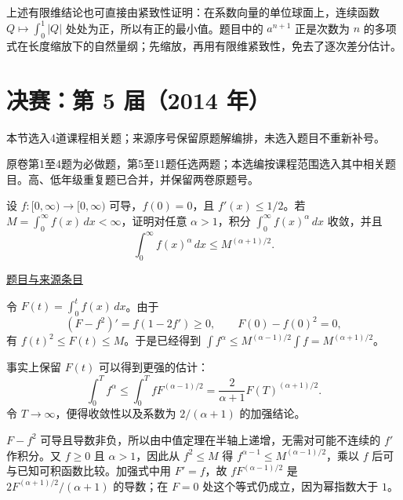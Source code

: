 \documentclass[12pt,fontset=fandol]{ctexart}
\begin{document}
\begin{remark}[方法与条件]上述有限维结论也可直接由紧致性证明：在系数向量的单位球面上，连续函数 $Q\mapsto\int_0^1|Q|$ 处处为正，所以有正的最小值。题目中的 $a^{n+1}$ 正是次数为 $n$ 的多项式在长度缩放下的自然量纲；先缩放，再用有限维紧致性，免去了逐次差分估计。\end{remark}

\section{决赛：第 5 届（2014 年）}

本节选入4道课程相关题；来源序号保留原题解编排，未选入题目不重新补号。

\begin{remark}[来源说明]原卷第1至4题为必做题，第5至11题任选两题；本选编按课程范围选入其中相关题目。高、低年级重复题已合并，并保留两卷原题号。\end{remark}

\begin{example}[来源序号3]\label{ex:fin05-hi:3}\label{pr:fin05-hi:3}

设 $f:[0,\infty)\to[0,\infty)$ 可导，$f(0)=0$，且 $f'(x)\le1/2$。若 $M=\int_0^\infty f(x)\,dx<\infty$，证明对任意 $\alpha>1$，积分 $\int_0^\infty f(x)^\alpha\,dx$ 收敛，并且
\[
\int_0^\infty f(x)^\alpha\,dx\le M^{(\alpha+1)/2}.
\]

\par\href{https://github.com/lzxcr/cmc-mathematics/blob/64916fa1fdbc3e444a652eca204d5669058ee321/src/problems/finals/05/03.md}{题目与来源条目}

\end{example}

\begin{solve}\label{ans:fin05-hi:3}

令 $F(t)=\int_0^t f(x)\,dx$。由于
\[
(F-f^2)'=f(1-2f')\ge0,\qquad F(0)-f(0)^2=0,
\]
有 $f(t)^2\le F(t)\le M$。于是已经得到
$\int f^\alpha\le M^{(\alpha-1)/2}\int f=M^{(\alpha+1)/2}$。

事实上保留 $F(t)$ 可以得到更强的估计：
\[
\int_0^T f^\alpha
\le\int_0^T fF^{(\alpha-1)/2}
=\frac{2}{\alpha+1}F(T)^{(\alpha+1)/2}.
\]
令 $T\to\infty$，便得收敛性以及系数为 $2/(\alpha+1)$ 的加强结论。

$F-f^2$ 可导且导数非负，所以由中值定理在半轴上递增，无需对可能不连续的 $f'$ 作积分。又 $f\ge0$ 且 $\alpha>1$，因此从 $f^2\le M$ 得 $f^{\alpha-1}\le M^{(\alpha-1)/2}$，乘以 $f$ 后可与已知可积函数比较。加强式中用 $F'=f$，故 $fF^{(\alpha-1)/2}$ 是 $2F^{(\alpha+1)/2}/(\alpha+1)$ 的导数；在 $F=0$ 处这个等式仍成立，因为幂指数大于 $1$。

\end{solve}
\end{document}
